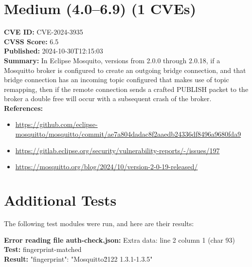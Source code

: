 \documentclass{article}
\begin{document}
\section*{Medium (4.0–6.9) (1 CVEs)}
\textbf{CVE ID:} CVE-2024-3935\\
\textbf{CVSS Score:} 6.5\\
\textbf{Published:} 2024-10-30T12:15:03\\
\textbf{Summary:} In Eclipse Mosquito, versions from 2.0.0 through 2.0.18, if a Mosquitto broker is configured to create an outgoing bridge connection, and that bridge connection has an incoming topic configured that makes use of topic remapping, then if the remote connection sends a crafted PUBLISH packet to the broker a double free will occur with a subsequent crash of the broker.\\
\textbf{References:}\\\begin{itemize}
\item \href{https://github.com/eclipse-mosquitto/mosquitto/commit/ae7a804dadac8f2aaedb24336df8496a9680fda9}{https://github.com/eclipse-mosquitto/mosquitto/commit/ae7a804dadac8f2aaedb24336df8496a9680fda9}
\item \href{https://gitlab.eclipse.org/security/vulnerability-reports/-/issues/197}{https://gitlab.eclipse.org/security/vulnerability-reports/-/issues/197}
\item \href{https://mosquitto.org/blog/2024/10/version-2-0-19-released/}{https://mosquitto.org/blog/2024/10/version-2-0-19-released/}
\end{itemize}
\vspace{0.5cm}
\section*{Additional Tests}
The following test modules were run, and here are their results:

\textbf{Error reading file auth-check.json:} Extra data: line 2 column 1 (char 93)\\
\textbf{Test:} fingerprint-matched\\
\textbf{Result:} {"fingerprint": "Mosquitto\u2122 1.3.1-1.3.5"}\\
\vspace{0.2cm}
\end{document}
